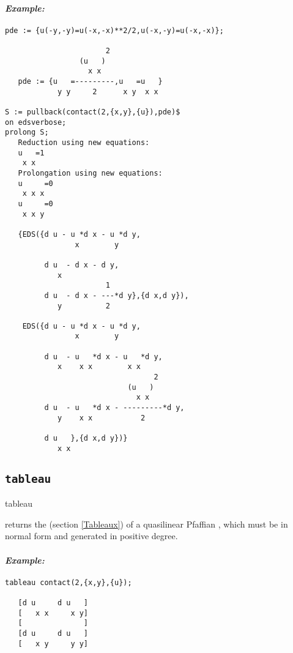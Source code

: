 \paragraph{\it Example:}
\begin{verbatim}
pde := {u(-y,-y)=u(-x,-x)**2/2,u(-x,-y)=u(-x,-x)};

                       2
                 (u   )
                   x x
   pde := {u   =---------,u   =u   }
            y y     2      x y  x x 

S := pullback(contact(2,{x,y},{u}),pde)$
on edsverbose;
prolong S;
   Reduction using new equations:  
   u   =1
    x x 
   Prolongation using new equations:  
   u     =0
    x x x  
   u     =0
    x x y 
   
   {EDS({d u - u *d x - u *d y,
                x        y 
   
         d u  - d x - d y,
            x 
                       1
         d u  - d x - ---*d y},{d x,d y}),
            y          2 
   
    EDS({d u - u *d x - u *d y,
                x        y 
   
         d u  - u   *d x - u   *d y,
            x    x x        x x 
                                  2
                            (u   )
                              x x
         d u  - u   *d x - ---------*d y,
            y    x x           2 
   
         d u   },{d x,d y})}
            x x 
\end{verbatim}

\subsection{\tt tableau}
\label{tableau}

\begin{syntax}
	tableau 
\end{syntax}
returns the  (section \ref{Tableaux}) of a quasilinear
Pfaffian , which must be in normal form and generated in positive
degree.

\paragraph{\it Example:}
\begin{verbatim}
tableau contact(2,{x,y},{u});

   [d u     d u   ]
   [   x x     x y]
   [              ]
   [d u     d u   ]
   [   x y     y y] 
\end{verbatim}


